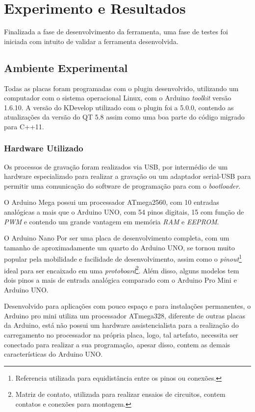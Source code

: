 \chapter{Experimento e Resultados}
Finalizada a fase de desenvolvimento da ferramenta, uma fase de testes foi iniciada com intuito de validar a ferramenta desenvolvida.

\section{Ambiente Experimental}

Todas as placas foram programadas com o plugin desenvolvido, utilizando um computador com o sistema operacional Linux, com o Arduino \textit{toolkit} versão 1.6.10. A versão do KDevelop utilizado com o plugin foi a 5.0.0, contendo as atualizações da versão do QT 5.8 assim como uma boa parte do código migrado para C++11.

\subsection{Hardware Utilizado}

Os processos de gravação foram realizados via USB, por intermédio de um hardware especializado para realizar a gravação ou um adaptador serial-USB para permitir uma comunicação do software de programação para com o \textit{bootloader}.

O Arduino Mega possui um processador ATmega2560, com 10 entradas analógicas a mais que o Arduino UNO, com 54 pinos digitais, 15 com função de \textit{PWM} e contendo um grande vantagem em memória \textit{RAM} e \textit{EEPROM}.



O Arduino Nano Por ser uma placa de desenvolvimento completa, com um tamanho de aproximadamente um quarto do Arduino UNO, se tornou muito popular pela mobilidade e facilidade de desenvolvimento, assim como o \textit{pinout}\footnote{ Referencia utilizada para equidistância entre os pinos ou conexões.} ideal para ser encaixado em uma \textit{protoboard}\footnote{Matriz de contato, utilizada para realizar ensaios de circuitos, contem contatos e conexões para montagem.}. Além disso, alguns modelos tem dois pinos a mais de entrada analógica comparado com o Arduino Pro Mini e Arduino UNO.

Desenvolvido para aplicações com pouco espaço e para instalações permanentes, o Arduino pro mini utiliza um processador ATmega328,  diferente de outras placas da Arduino, está não possui um hardware assistencialista para a realização do carregamento no processador na própria placa, logo, tal artefato, necessita ser conectado para realizar a sua programação, apesar disso, contem as demais características do Arduino UNO.

